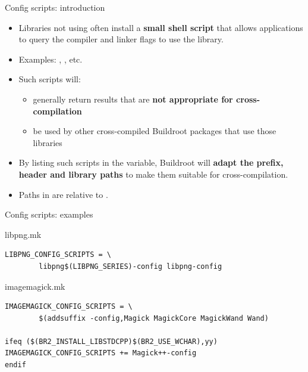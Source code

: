 \begin{frame}{Config scripts: introduction}
  \begin{itemize}
  \item Libraries not using  often install a {\bf
      small shell script} that allows applications to query the
    compiler and linker flags to use the library.
  \item Examples: , , etc.
  \item Such scripts will:
    \begin{itemize}
    \item generally return results that are {\bf not appropriate for
        cross-compilation}
    \item be used by other cross-compiled Buildroot packages that use
      those libraries
    \end{itemize}
  \item By listing such scripts in the 
    variable, Buildroot will {\bf adapt the prefix, header and library
      paths} to make them suitable for cross-compilation.
  \item Paths in  are relative to
    .
  \end{itemize}
\end{frame}

\begin{frame}[fragile]{Config scripts: examples}

  \begin{block}{libpng.mk}
    \begin{verbatim}
LIBPNG_CONFIG_SCRIPTS = \
        libpng$(LIBPNG_SERIES)-config libpng-config
\end{verbatim}
\end{block}

\begin{block}{imagemagick.mk}
  \begin{verbatim}
IMAGEMAGICK_CONFIG_SCRIPTS = \
        $(addsuffix -config,Magick MagickCore MagickWand Wand)

ifeq ($(BR2_INSTALL_LIBSTDCPP)$(BR2_USE_WCHAR),yy)
IMAGEMAGICK_CONFIG_SCRIPTS += Magick++-config
endif
\end{verbatim}
\end{block}

\end{frame}


